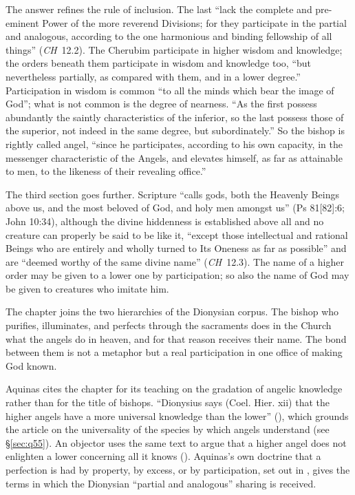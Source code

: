 The answer refines the rule of inclusion. The last ``lack the complete
and pre-eminent Power of the more reverend Divisions; for they
participate in the partial and analogous, according to the one
harmonious and binding fellowship of all things'' (\emph{CH}~12.2). The
Cherubim participate in higher wisdom and knowledge; the orders beneath
them participate in wisdom and knowledge too, ``but nevertheless
partially, as compared with them, and in a lower degree.'' Participation
in wisdom is common ``to all the minds which bear the image of God'';
what is not common is the degree of nearness. ``As the first possess
abundantly the saintly characteristics of the inferior, so the last
possess those of the superior, not indeed in the same degree, but
subordinately.'' So the bishop is rightly called angel, ``since he
participates, according to his own capacity, in the messenger
characteristic of the Angels, and elevates himself, as far as attainable
to men, to the likeness of their revealing office.''

The third section goes further. Scripture ``calls gods, both the Heavenly
Beings above us, and the most beloved of God, and holy men amongst us''
(Ps 81[82]:6; John 10:34), although the divine hiddenness is established
above all and no creature can properly be said to be like it, ``except
those intellectual and rational Beings who are entirely and wholly
turned to Its Oneness as far as possible'' and are ``deemed worthy of the
same divine name'' (\emph{CH}~12.3). The name of a higher order may be
given to a lower one by participation; so also the name of God may be
given to creatures who imitate him.

The chapter joins the two hierarchies of the Dionysian corpus. The
bishop who purifies, illuminates, and perfects through the sacraments
does in the Church what the angels do in heaven, and for that reason
receives their name. The bond between them is not a metaphor but a
real participation in one office of making God known.

Aquinas cites the chapter for its teaching on the gradation of angelic
knowledge rather than for the title of bishops. ``Dionysius says (Coel.
Hier. xii) that the higher angels have a more universal knowledge than
the lower'' (), which grounds the article on the
universality of the species by which angels understand (see
\S\ref{sec:q55}). An objector uses the same text to argue that a higher
angel does not enlighten a lower concerning all it knows (). Aquinas's own doctrine that a perfection is had by property, by excess, or by
participation, set out in , gives the terms in
which the Dionysian ``partial and analogous'' sharing is received.

